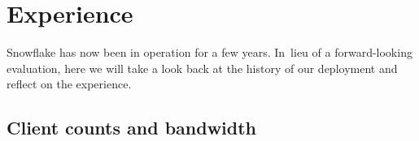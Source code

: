 \documentclass[letterpaper,twocolumn]{article}
\begin{document}
\begin{figure}[t]
{%
}
\label{fig:user-counts}
\end{figure}

\section{Experience}
\label{sec:experience}

Snowflake has now been in operation for a few years.
In~lieu of a forward-looking evaluation,
here we will take a look back
at the history of our deployment
and reflect on the experience.

\subsection{Client counts and bandwidth}
\label{sec:deployment}
\end{document}
